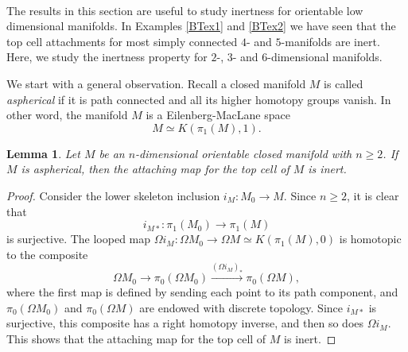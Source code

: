 \documentclass[a4]{amsart}
\newtheorem{lemma}[theorem]{Lemma}
\theoremstyle{definition}
\begin{document}
\begin{sloppypar}
$\, $

The results in this section are useful to study inertness for orientable low dimensional manifolds. In Examples \ref{BTex1} and \ref{BTex2} we have seen that the top cell attachments for most simply connected $4$- and $5$-manifolds are inert. Here, we study the inertness property for $2$-, $3$- and $6$-dimensional manifolds. 

We start with a general observation. Recall a closed manifold $M$ is called {\it aspherical} if it is path connected and all its higher homotopy groups vanish. In other word, the manifold $M$ is a Eilenberg-MacLane space 
\[
M\simeq K(\pi_1(M), 1).
\] 
\begin{lemma}\label{asph-inert-lemma}
Let $M$ be an $n$-dimensional orientable closed manifold with $n\geq 2$. If $M$ is aspherical, then the attaching map for the top cell of $M$ is inert.
\end{lemma}
\begin{proof}
Consider the lower skeleton inclusion $i_M: M_0\stackrel{}{\longrightarrow} M$. Since $n\geq 2$, it is clear that 
\[
i_{M\ast}: \pi_1(M_0)\stackrel{}{\longrightarrow} \pi_1(M)
\]
is surjective. The looped map $\Omega i_M: \Omega M_0\stackrel{}{\longrightarrow} \Omega M\simeq K(\pi_1(M), 0)$ is homotopic to the composite
\[
\Omega M_0\stackrel{}{\longrightarrow}\pi_0(\Omega M_0)\stackrel{(\Omega i_M)_\ast}{\longrightarrow}\pi_0(\Omega M),
\]
where the first map is defined by sending each point to its path component, and $\pi_0(\Omega M_0)$ and $\pi_0(\Omega M)$ are endowed with discrete topology. Since $i_{M\ast}$ is surjective, this composite has a right homotopy inverse, and then so does $\Omega i_M$. This shows that the attaching map for the top cell of $M$ is inert.
\end{proof}


\end{sloppypar}
\end{document}
